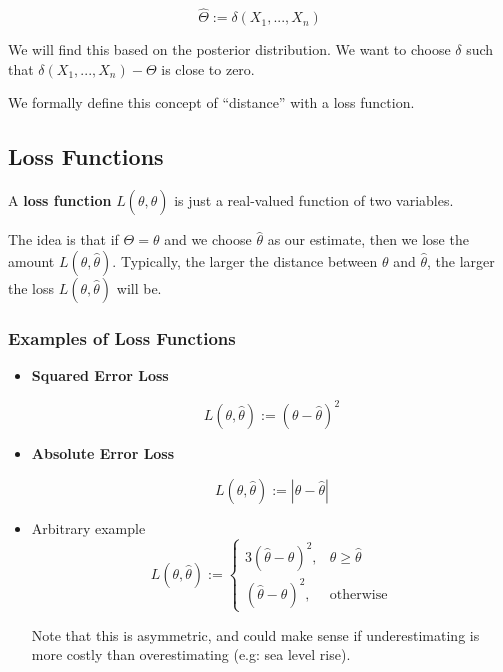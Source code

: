 \documentclass[a4paper]{article}
\begin{document}
        \[
            \widehat \Theta := \delta(X_1, ..., X_n)
        \]

        We will find this based on the posterior distribution. We want to choose
        $\delta$ such that $\delta(X_1, ..., X_n) - \Theta$ is close to zero.

        We formally define this concept of ``distance'' with a loss function.

        \subsection{Loss Functions}
            \begin{definition}
                A \textbf{loss function} $L(\theta, \widehat \theta)$ is just a
                real-valued function of two variables.

                The idea is that if $\Theta = \theta$ and we choose $\widehat
                \theta$ as our estimate, then we lose the amount $L(\theta,
                \widehat \theta)$. Typically, the larger the distance between
                $\theta$ and $\widehat \theta$, the larger the loss $L(\theta,
                \widehat \theta)$ will be.
            \end{definition}

            \subsubsection{Examples of Loss Functions}
                \begin{itemize}
                    \item \textbf{Squared Error Loss}

                        \[
                            L(\theta, \widehat \theta) := (\theta - \widehat
                            \theta)^2
                        \]

                    \item \textbf{Absolute Error Loss}

                        \[
                            L(\theta, \widehat \theta) := |\theta - \widehat
                            \theta|
                        \]

                    \item Arbitrary example
                        \[
                            L(\theta, \widehat \theta) := \begin{cases}3(
                            \widehat \theta - \theta)^2, & \theta \geq \widehat
                            \theta \\ (\widehat \theta - \theta)^2, &
                            \text{otherwise} \end{cases}
                        \]

                        Note that this is asymmetric, and could make sense if
                        underestimating is more costly than overestimating (e.g:
                        sea level rise).
                \end{itemize}
\end{document}
